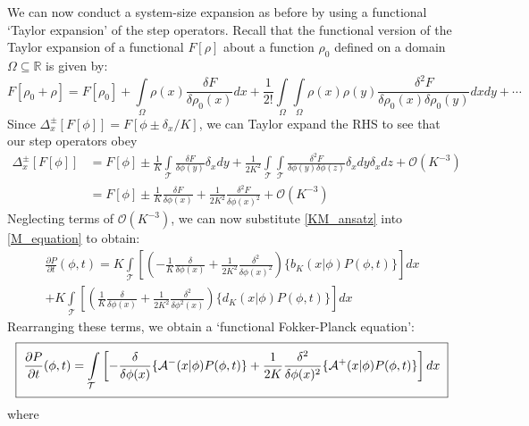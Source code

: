 We can now conduct a system-size expansion as before by using a functional `Taylor expansion' of the step operators. Recall that the functional version of the Taylor expansion of a functional $F[\rho]$ about a function $\rho_0$ defined on a domain $\Omega \subseteq \mathbb{R}$ is given by:
\begin{equation*}
    F[\rho_0 + \rho] = F[\rho_0] + \int\limits_{\Omega}\rho(x)\frac{\delta F}{\delta \rho_0(x)}dx + \frac{1}{2!}\int\limits_{\Omega}\int\limits_{\Omega}\rho(x)\rho(y)\frac{\delta^2 F}{\delta \rho_0(x)\delta \rho_0(y)}dxdy + \cdots
\end{equation*}
Since $\Delta^{\pm}_{x}[F[\phi]] = F[\phi \pm \delta_x/K]$, we can Taylor expand the RHS to see that our step operators obey
\begin{align}
    \Delta^{\pm}_{x}[F[\phi]] &= F[\phi] \pm \frac{1}{K}\int\limits_{\mathcal{T}}\frac{\delta F}{\delta \phi(y)}\delta_xdy + \frac{1}{2K^2}\int\limits_{\mathcal{T}}\int\limits_{\mathcal{T}}\frac{\delta^2 F}{\delta \phi(y)\delta \phi(z)}\delta_xdy\delta_xdz+\mathcal{O}(K^{-3})\nonumber\\
    &= F[\phi] \pm \frac{1}{K}\frac{\delta F}{\delta \phi(x)} + \frac{1}{2K^2}\frac{\delta^2 F}{\delta \phi(x)^2}+\mathcal{O}(K^{-3})
    \label{KM_ansatz}
\end{align}
Neglecting terms of $\mathcal{O}(K^{-3})$, we can now substitute \eqref{KM_ansatz} into \eqref{M_equation} to obtain:
\begin{equation*}
\begin{split}
\frac{\partial P}{\partial t}(\phi,t) = K\int\limits_{\mathcal{T}}\left[
    \left(-\frac{1}{K}\frac{\delta}{\delta\phi(x)} + \frac{1}{2K^2}\frac{\delta^2}{\delta\phi(x)^2}\right)\{b_K(x|\phi)P(\phi,t)\}\right]dx\\
    +K\int\limits_{\mathcal{T}}\left[\left(\frac{1}{K}\frac{\delta}{\delta\phi(x)} + \frac{1}{2K^2}\frac{\delta^2}{\delta\phi^2(x)}\right)\{d_K(x|\phi)P(\phi,t)\}\right]dx
\end{split}
\end{equation*}
Rearranging these terms, we obtain a `functional Fokker-Planck equation':
\begin{equation}
\label{functional_FPE}
\setlength{\fboxsep}{2\fboxsep}\boxed{\frac{\partial P}{\partial t}(\phi,t) = \int\limits_{\mathcal{T}}\left[-
    \frac{\delta}{\delta\phi(x)}\{\mathcal{A}^{-}(x|\phi)P(\phi,t)\} + \frac{1}{2K}\frac{\delta^2}{\delta\phi(x)^2}\{\mathcal{A}^{+}(x|\phi)P(\phi,t)\}\right]dx}
\end{equation}
where
